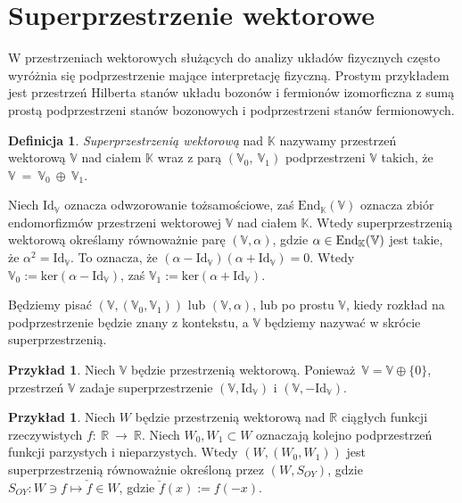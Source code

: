 \documentclass[11pt,a4paper]{report}
\theoremstyle{definition}
\newtheorem{example}[theorem]{Przykład}
\newtheorem{definition}[theorem]{Definicja}
\begin{document}
\section{Superprzestrzenie wektorowe}

W przestrzeniach wektorowych służących do analizy układów fizycznych często wyróżnia się podprzestrzenie mające interpretację fizyczną. Prostym przykładem jest przestrzeń Hilberta stanów układu bozonów i fermionów izomorficzna z sumą prostą podprzestrzeni stanów bozonowych i podprzestrzeni stanów fermionowych.

\begin{definition}
\textit{Superprzestrzenią wektorową} nad $\mathbb{K}$ nazywamy przestrzeń wektorową $\mathbb{V}$ nad ciałem $\mathbb{K}$ wraz z parą $(\mathbb{V}_0,\ \mathbb{V}_1)$ podprzestrzeni $\mathbb{V}$ takich, że $\mathbb{V}~=~\mathbb{V}_0~\oplus~\mathbb{V}_1.$
\end{definition}

Niech $\mathrm{Id}_\mathbb{V}$ oznacza odwzorowanie tożsamościowe, zaś $\mathrm{End}_\mathbb{K} (\mathbb{V})$ oznacza zbiór endomorfizmów przestrzeni wektorowej $\mathbb{V}$ nad ciałem $\mathbb{K}$. Wtedy superprzestrzenią wektorową określamy równoważnie parę $\left( \mathbb{V}, \alpha \right)$, gdzie $\alpha \in \rm{End_{\mathbb{K}}(\mathbb{V})}$ jest takie, że $\alpha^2 = \textrm{Id}_\mathbb{V}$. To oznacza, że $( \alpha - \textrm{Id}_\mathbb{V} )(\alpha + \textrm{Id}_\mathbb{V} ) = 0$. Wtedy $\mathbb{V}_0 := \textrm{ker} ( \alpha - \textrm{Id}_\mathbb{V} )$, zaś $\mathbb{V}_1 := \textrm{ker}(\alpha + \textrm{Id}_\mathbb{V} )$.

Będziemy pisać $\left( \mathbb{V},(\mathbb{V}_0,\mathbb{V}_1) \right)$ lub $\left( \mathbb{V}, \alpha \right)$, lub po prostu $\mathbb{V}$, kiedy rozkład na podprzestrzenie będzie znany z kontekstu, a $\mathbb{V}$ będziemy nazywać w skrócie superprzestrzenią.

\begin{example}
Niech $\mathbb{V}$ będzie przestrzenią wektorową. Ponieważ~$\mathbb{V} = \mathbb{V} \oplus \{0\}$, przestrzeń $\mathbb{V}$ zadaje superprzestrzenie $(\mathbb{V}, \textrm{Id}_\mathbb{V})$ i $(\mathbb{V}, -\textrm{Id}_\mathbb{V})$.
\end{example}

\begin{example}
Niech $W$ będzie przestrzenią wektorową nad $\mathbb{R}$ ciągłych funkcji rzeczywistych $f:~\mathbb{R}~\rightarrow~\mathbb{R}$. Niech $W_0, W_1 \subset W$ oznaczają kolejno podprzestrzeń funkcji parzystych i nieparzystych. Wtedy $\left( W,(W_0, W_1) \right)$ jest superprzestrzenią równoważnie określoną przez $(W, S_{OY})$, gdzie $S_{OY}: W \ni f \mapsto \check{f} \in W$, gdzie $\breve{f} (x) := f(-x).$
\end{example}
\end{document}
